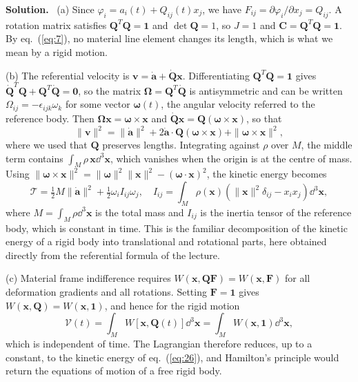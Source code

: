 \documentclass[a4paper,12pt]{paper}
\newenvironment{solution}{\par\noindent\textbf{Solution.}\ }{\par\medskip}
\begin{document}
\begin{solution}
(a) Since $\varphi_{i}=a_{i}(t)+Q_{ij}(t)x_{j}$, we have
$F_{ij}=\partial\varphi_{i}/\partial x_{j}=Q_{ij}$. A rotation matrix satisfies
$\mathbf{Q}^{T}\mathbf{Q}=\mathbf{1}$ and $\det\mathbf{Q}=1$, so $J=1$ and
$\mathbf{C}=\mathbf{Q}^{T}\mathbf{Q}=\mathbf{1}$. By eq.~(\ref{eq:7}), no material line element
changes its length, which is what we mean by a rigid motion.

(b) The referential velocity is $\mathbf{v}=\dot{\mathbf{a}}+\dot{\mathbf{Q}}\mathbf{x}$.
Differentiating $\mathbf{Q}^{T}\mathbf{Q}=\mathbf{1}$ gives
$\dot{\mathbf{Q}}^{T}\mathbf{Q}+\mathbf{Q}^{T}\dot{\mathbf{Q}}=\mathbf{0}$, so the matrix
$\bm{\Omega}=\mathbf{Q}^{T}\dot{\mathbf{Q}}$ is antisymmetric and can be written
$\Omega_{ij}=-\epsilon_{ijk}\omega_{k}$ for some vector $\bm{\omega}(t)$, the angular velocity
referred to the reference body. Then $\bm{\Omega}\mathbf{x}=\bm{\omega}\times\mathbf{x}$ and
$\dot{\mathbf{Q}}\mathbf{x}=\mathbf{Q}(\bm{\omega}\times\mathbf{x})$, so that
\begin{equation}
\|\mathbf{v}\|^{2}=\|\dot{\mathbf{a}}\|^{2}+2\dot{\mathbf{a}}\cdot\mathbf{Q}(\bm{\omega}\times\mathbf{x})
+\|\bm{\omega}\times\mathbf{x}\|^{2},
\label{eq:25}
\end{equation}
where we used that $\mathbf{Q}$ preserves lengths. Integrating against $\rho$ over $M$, the
middle term contains $\int_{M}\rho\,\mathbf{x}\dd^{3}\mathbf{x}$, which vanishes when the
origin is at the centre of mass. Using
$\|\bm{\omega}\times\mathbf{x}\|^{2}=\|\bm{\omega}\|^{2}\|\mathbf{x}\|^{2}-(\bm{\omega}\cdot\mathbf{x})^{2}$,
the kinetic energy becomes
\begin{equation}
\mathcal{T}=\tfrac{1}{2}M\|\dot{\mathbf{a}}\|^{2}+\tfrac{1}{2}\omega_{i}I_{ij}\omega_{j},\quad
I_{ij}=\int_{M}\rho(\mathbf{x})\left(\|\mathbf{x}\|^{2}\delta_{ij}-x_{i}x_{j}\right)\dd^{3}\mathbf{x},
\label{eq:26}
\end{equation}
where $M=\int_{M}\rho\dd^{3}\mathbf{x}$ is the total mass and $I_{ij}$ is the inertia tensor
of the reference body, which is constant in time. This is the familiar decomposition of the
kinetic energy of a rigid body into translational and rotational parts, here obtained
directly from the referential formula of the lecture.

(c) Material frame indifference requires $W(\mathbf{x},\mathbf{Q}\mathbf{F})=W(\mathbf{x},\mathbf{F})$
for all deformation gradients and all rotations. Setting $\mathbf{F}=\mathbf{1}$ gives
$W(\mathbf{x},\mathbf{Q})=W(\mathbf{x},\mathbf{1})$, and hence for the rigid motion
\begin{equation}
\mathcal{V}(t)=\int_{M}W[\mathbf{x},\mathbf{Q}(t)]\dd^{3}\mathbf{x}=\int_{M}W(\mathbf{x},\mathbf{1})\dd^{3}\mathbf{x},
\label{eq:27}
\end{equation}
which is independent of time. The Lagrangian therefore reduces, up to a constant, to the
kinetic energy of eq.~(\ref{eq:26}), and Hamilton's principle would return the equations of
motion of a free rigid body.


\end{solution}
\end{document}
